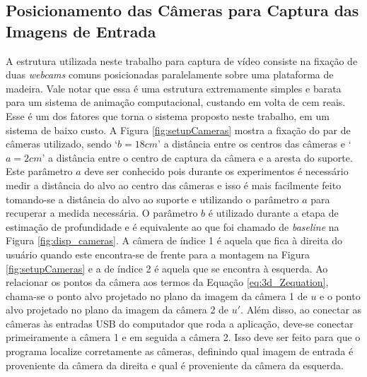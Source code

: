 \subsection{Posicionamento das Câmeras para Captura das Imagens de Entrada}


A estrutura utilizada neste trabalho para captura de vídeo consiste na fixação
de duas \textit{webcams} comuns posicionadas paralelamente sobre uma plataforma
de madeira. Vale notar que essa é uma estrutura extremamente simples e barata para um 
sistema de animação computacional, custando em volta de cem reais. Esse é um dos fatores que 
torna o sistema proposto neste trabalho, em um sistema de baixo custo. A Figura 
\ref{fig:setupCameras} mostra a fixação do 
par de câmeras utilizado, sendo `$b = 18cm$'  a distância entre os centros das câmeras e 
`$a=2 cm$' a distância entre o centro de captura da câmera e a aresta do suporte.
Este parâmetro $a$ deve ser conhecido pois durante os experimentos é necessário
medir a distância do alvo ao centro das câmeras e isso é mais facilmente feito
tomando-se a distância do alvo ao suporte e utilizando o parâmetro $a$ para
recuperar a medida necessária. O parâmetro $b$ é utilizado durante a etapa de
estimação de profundidade e é equivalente ao que foi chamado de
\textit{baseline} na Figura \ref{fig:disp_cameras}. A câmera de índice 1 é
aquela que fica à direita do usuário quando este encontra-se de frente para a
montagem na Figura \ref{fig:setupCameras} e a de índice 2 é aquela que se
encontra à esquerda. Ao relacionar os pontos da câmera aos termos da Equação
\ref{eq:3d_Zequation}, chama-se o ponto alvo projetado no plano da imagem da
câmera 1 de $u$ e o ponto alvo projetado no plano da imagem da câmera 2 de $u'$.
Além disso, ao conectar as câmeras às entradas USB do computador que roda a
aplicação, deve-se conectar primeiramente a câmera 1 e em seguida a câmera 2.
Isso deve ser feito para que o programa localize corretamente as câmeras,
definindo qual imagem de entrada é proveniente da câmera da direita e qual é
proveniente da câmera da esquerda. 


